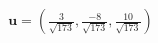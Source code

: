 \documentclass[preview]{standalone}
\begin{document}
\begin{align*}
\mathbf{u} = \left(\frac{3}{\sqrt{173}},\frac{-8}{\sqrt{173}},\frac{10}{\sqrt{173}}\right)
\end{align*}
\end{document}
